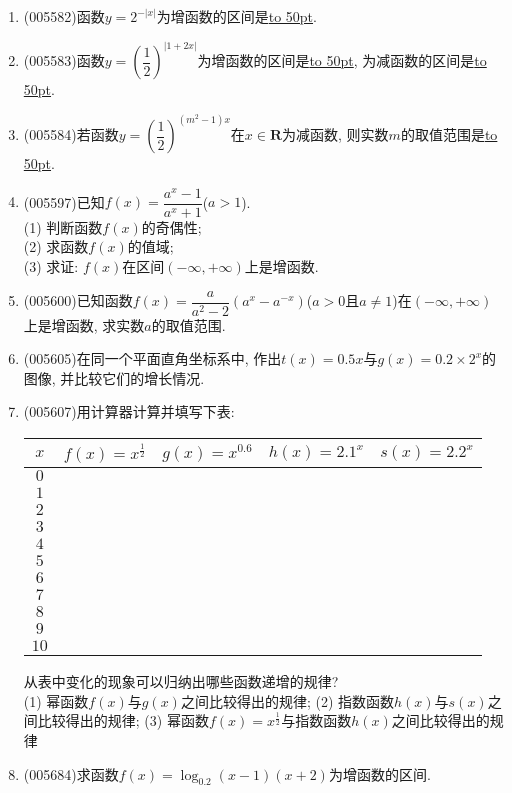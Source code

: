 \documentclass[10pt,a4paper]{article}
\newcommand{\blank}[1]{\underline{\hbox to #1pt{}}}
\begin{document}
\begin{enumerate}[1.]
\item {\tiny (005582)}函数$y=2^{-|x|}$为增函数的区间是\blank{50}.
\item {\tiny (005583)}函数$y=(\dfrac 12)^{|1+2x|}$为增函数的区间是\blank{50}, 为减函数的区间是\blank{50}.
\item {\tiny (005584)}若函数$y=(\dfrac 12)^{(m^2-1)x}$在$x\in \mathbf{R}$为减函数, 则实数$m$的取值范围是\blank{50}.
\item {\tiny (005597)}已知$f(x)=\dfrac{a^x-1}{a^x+1}$($a>1$).\\
(1) 判断函数$f(x)$的奇偶性;\\
(2) 求函数$f(x)$的值域;\\
(3) 求证: $f(x)$在区间$(-\infty ,+\infty)$上是增函数.
\item {\tiny (005600)}已知函数$f(x)=\dfrac a{a^2-2}(a^x-a^{-x})$($a>0$且$a\ne 1$)在$(-\infty ,+\infty)$上是增函数, 求实数$a$的取值范围.
\item {\tiny (005605)}在同一个平面直角坐标系中, 作出$t(x)=0.5x$与$g(x)=0.2\times 2^x$的图像, 并比较它们的增长情况.
\item {\tiny (005607)}用计算器计算并填写下表:
\begin{center}
    \begin{tabular}{|c|c|c|c|c|}
        \hline
        $x$	& $f(x)=x^{\frac 12}$ & $g(x)=x^{0.6}$ & $h(x)=2.1^x$ & $s(x)=2.2^x$ \\ \hline
        $0$ & & & & \\ \hline
        $1$ & & & & \\ \hline
        $2$ & & & & \\ \hline
        $3$ & & & & \\ \hline
        $4$ & & & & \\ \hline
        $5$ & & & & \\ \hline
        $6$ & & & & \\ \hline
        $7$ & & & & \\ \hline
        $8$ & & & & \\ \hline
        $9$ & & & & \\ \hline
        $10$ & & & & \\ \hline
    \end{tabular}
\end{center}
从表中变化的现象可以归纳出哪些函数递增的规律?\\
(1) 幂函数$f(x)$与$g(x)$之间比较得出的规律;
(2) 指数函数$h(x)$与$s(x)$之间比较得出的规律;
(3) 幂函数$f(x)=x^{\frac 12}$与指数函数$h(x)$之间比较得出的规律
\item {\tiny (005684)}求函数$f(x)=\log_{0.2}(x-1)(x+2)$为增函数的区间.

\end{enumerate}
\end{document}
